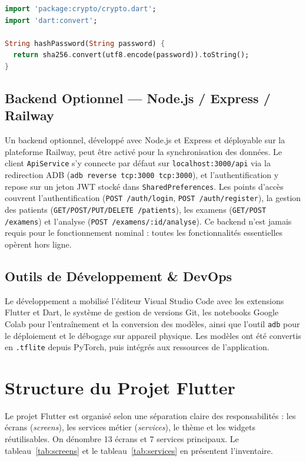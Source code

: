 \documentclass[12pt,a4paper]{report}
\begin{document}
\begin{lstlisting}[language=Dart, caption={Hachage SHA-256 du mot de passe}, label={lst:hash}]
import 'package:crypto/crypto.dart';
import 'dart:convert';

String hashPassword(String password) {
  return sha256.convert(utf8.encode(password)).toString();
}
\end{lstlisting}

\subsection{Backend Optionnel --- Node.js / Express / Railway}
Un backend optionnel, développé avec Node.js et Express et déployable sur la plateforme Railway, peut être activé pour la synchronisation des données. Le client \texttt{ApiService} s'y connecte par défaut sur \texttt{localhost:3000/api} via la redirection ADB (\texttt{adb reverse tcp:3000 tcp:3000}), et l'authentification y repose sur un jeton JWT stocké dans \texttt{SharedPreferences}. Les points d'accès couvrent l'authentification (\texttt{POST /auth/login}, \texttt{POST /auth/register}), la gestion des patients (\texttt{GET/POST/PUT/DELETE /patients}), les examens (\texttt{GET/POST /examens}) et l'analyse (\texttt{POST /examens/:id/analyse}). Ce backend n'est jamais requis pour le fonctionnement nominal : toutes les fonctionnalités essentielles opèrent hors ligne.

\subsection{Outils de Développement \& DevOps}
Le développement a mobilisé l'éditeur Visual Studio Code avec les extensions Flutter et Dart, le système de gestion de versions Git, les notebooks Google Colab pour l'entraînement et la conversion des modèles, ainsi que l'outil \texttt{adb} pour le déploiement et le débogage sur appareil physique. Les modèles ont été convertis en \texttt{.tflite} depuis PyTorch, puis intégrés aux ressources de l'application.

\section{Structure du Projet Flutter}
Le projet Flutter est organisé selon une séparation claire des responsabilités : les écrans (\textit{screens}), les services métier (\textit{services}), le thème et les widgets réutilisables. On dénombre 13 écrans et 7 services principaux. Le tableau~\ref{tab:screens} et le tableau~\ref{tab:services} en présentent l'inventaire.
\end{document}
